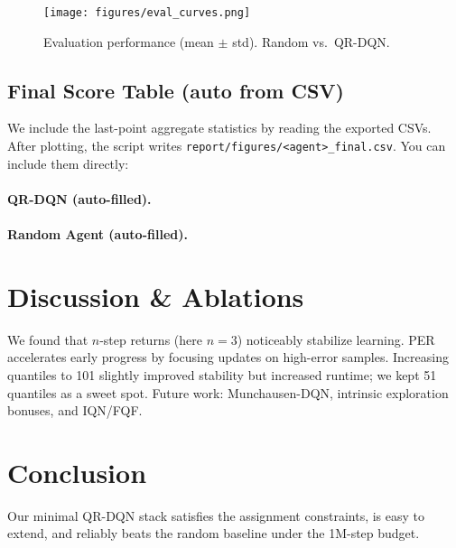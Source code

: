 \documentclass[11pt]{article}
\begin{document}
\begin{figure}[h]
\centering
\texttt{[image: figures/eval\_curves.png]}
\caption{Evaluation performance (mean $\pm$ std). Random vs.\ QR-DQN.}
\label{fig:curves}
\end{figure}

\subsection*{Final Score Table (auto from CSV)}
We include the last-point aggregate statistics by reading the exported CSVs. After plotting, the script writes \texttt{report/figures/<agent>\_final.csv}. You can include them directly:

\paragraph{QR-DQN (auto-filled).}

\paragraph{Random Agent (auto-filled).}

\section{Discussion \& Ablations}
We found that $n$-step returns (here $n{=}3$) noticeably stabilize learning. PER accelerates early progress by focusing updates on high-error samples. Increasing quantiles to 101 slightly improved stability but increased runtime; we kept 51 quantiles as a sweet spot. Future work: Munchausen-DQN, intrinsic exploration bonuses, and IQN/FQF.

\section{Conclusion}
Our minimal QR-DQN stack satisfies the assignment constraints, is easy to extend, and reliably beats the random baseline under the 1M-step budget.



\end{document}

